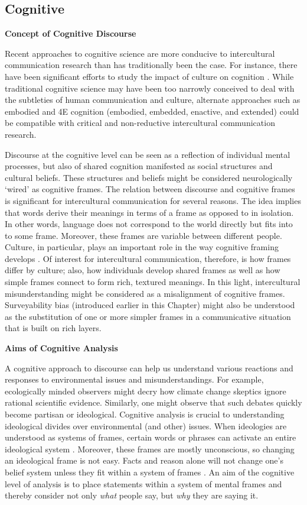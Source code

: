 \subsection{Cognitive}

\textbf{Concept of Cognitive Discourse}

Recent approaches to cognitive science are more conducive to intercultural communication research than has traditionally been the case. For instance, there have been significant efforts to study the impact of culture on cognition \citep{Prinz2016b}. While traditional cognitive science may have been too narrowly conceived to deal with the subtleties of human communication and culture, alternate approaches such as embodied and 4E cognition (embodied, embedded, enactive, and extended) could be compatible with critical and non-reductive intercultural communication research. 

Discourse at the cognitive level can be seen as a reflection of individual mental processes, but also of shared cognition manifested as social structures and cultural beliefs. These structures and beliefs might be considered neurologically `wired' as cognitive frames. The relation between discourse and cognitive frames is significant for intercultural communication for several reasons. The idea implies that words derive their meanings in terms of a frame as opposed to in isolation. In other words, language does not correspond to the world directly but fits into to some frame. Moreover, these frames are variable between different people. Culture, in particular, plays an important role in the way cognitive framing develops \citep{Han2011a}. Of interest for intercultural communication, therefore, is how frames differ by culture; also, how individuals develop shared frames as well as how simple frames connect to form rich, textured meanings. In this light, intercultural misunderstanding might be considered as a misalignment of cognitive frames. Surveyability bias (introduced earlier in this Chapter) might also be understood as the substitution of one or more simpler frames in a communicative situation that is built on rich layers.

\textbf{Aims of Cognitive Analysis}

A cognitive approach to discourse can help us understand various reactions and responses to environmental issues and misunderstandings. For example, ecologically minded observers might decry how climate change skeptics ignore rational scientific evidence. Similarly, one might observe that such debates quickly become partisan or ideological. Cognitive analysis is crucial to understanding ideological divides over environmental (and other) issues. When ideologies are understood as systems of frames, certain words or phrases can activate an entire ideological system \citep[72]{Lakoff2010a}. Moreover, these frames are mostly unconscious, so changing an ideological frame is not easy. Facts and reason alone will not change one's belief system unless they fit within a system of frames \citep[73]{Lakoff2010a}. An aim of the cognitive level of analysis is to place statements within a system of mental frames and thereby consider not only \textit{what} people say, but \textit{why} they are saying it. 

